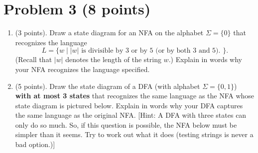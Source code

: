 \documentclass{../homework}
\begin{document}
\clearpage
\section{Problem 3 (8 points)}

\begin{enumerate}
    \item (3 points). Draw a state diagram for an NFA on the alphabet $\Sigma = \{0\}$ that recognizes the language
    \[
        L = \{w \; | \; |w| \text{ is divisible by 3 or by 5 (or by both 3 and 5). } \}.
    \]
    (Recall that $|w|$ denotes the length of the string $w$.) Explain in words why your NFA recognizes the language specified.
    
    
    \item (5 points). Draw the state diagram of a DFA (with alphabet $\Sigma = \{0,1\}$) \textbf{with at most 3 states} that recognizes the same language as the NFA whose state diagram is pictured below. Explain in words why your DFA captures the same language as the original NFA. [Hint: A DFA with three states can only do so much. So, if this question is possible, the NFA below must be simpler than it seems. Try to work out what it does (testing strings is never a bad option.)]
    

\end{enumerate}
\end{document}

